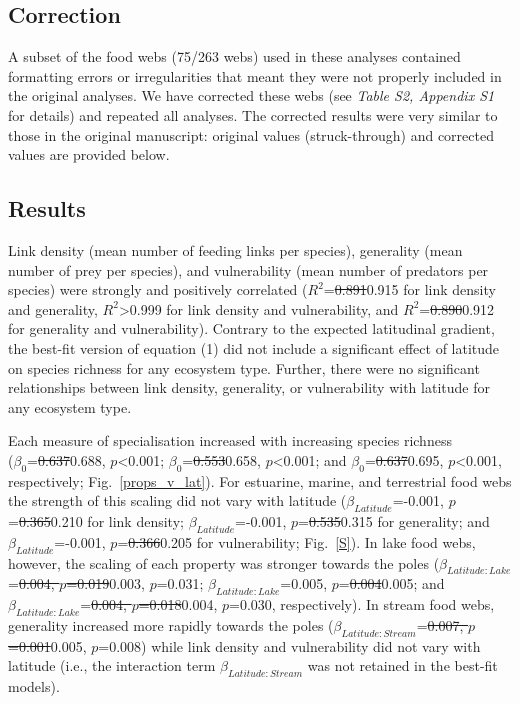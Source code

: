 \documentclass[12pt]{article}
\begin{document}
\begin{spacing}{2.0}

\section*{Correction} 
  
  A subset of the food webs (75/263 webs) used in these analyses contained formatting errors or irregularities that meant they were not properly included in the original analyses. We have corrected these webs (see \emph{Table S2, Appendix S1} for details) and repeated all analyses. The corrected results were very similar to those in the original manuscript: original values (struck-through) and corrected values are provided below.

\subsection*{Results}

  Link density (mean number of feeding links per species), generality (mean
  number of prey per species), and vulnerability (mean number of predators per
  species) were strongly and positively correlated ($R^2$=\st{0.891}0.915 for link
  density and generality, $R^2$\textgreater0.999 for link density and
  vulnerability, and $R^2$=\st{0.890}0.912 for generality and vulnerability). Contrary
  to the expected latitudinal gradient, the best-fit version of
  equation (1) did not include a significant
  effect of latitude on species richness for any ecosystem type. Further, there were no significant
  relationships between link density, generality, or vulnerability with
  latitude for any ecosystem type.


  Each measure of specialisation increased with increasing
  species richness \\($\beta_0$=\st{0.637}0.688, $p$\textless0.001; $\beta_0$=\st{0.553}0.658,
  $p$\textless0.001; and $\beta_0$=\st{0.637}0.695, $p$\textless0.001, respectively;
  Fig.~\ref{props_v_lat}). For estuarine, marine, and terrestrial food webs the
  strength of this scaling did not vary with latitude
  ($\beta_{Latitude}$=-0.001, $p$=\st{0.365}0.210 for link density;
  $\beta_{Latitude}$=-0.001, $p$=\st{0.535}0.315 for generality; and
  $\beta_{Latitude}$=-0.001, $p$=\st{0.366}0.205 for vulnerability; Fig.~\ref{S}). In
  lake food webs, however, the scaling of each property was stronger towards
  the poles ($\beta_{Latitude:Lake}$=\st{0.004, $p$=0.019}0.003, $p$=0.031;
  $\beta_{Latitude:Lake}$=0.005, $p$=\st{0.004}0.005; and
  $\beta_{Latitude:Lake}$=\st{0.004, $p$=0.018}0.004, $p$=0.030, respectively). In stream food
  webs, generality increased more rapidly towards the poles
  ($\beta_{Latitude:Stream}$=\st{0.007, $p$=0.001}0.005, $p$=0.008) while link density and
  vulnerability did not vary with latitude (i.e., the interaction term 
  $\beta_{Latitude:Stream}$ was not retained in the best-fit models).



\end{spacing}
\end{document}
